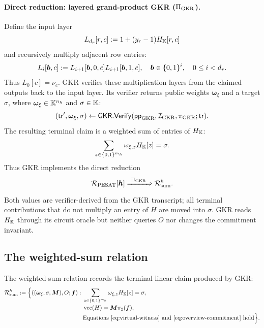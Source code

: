 \paragraph{Direct reduction: layered grand-product GKR
($\Pi_{\rm GKR}$).}
Define the input layer
\begin{equation}
 L_{d_r}[r,c]
 :=1+(y_r-1)H_{\mathbb K}[r,c]
 \label{eq:pesat-input-layer}
\end{equation}
and recursively multiply adjacent row entries:
\begin{equation}
 L_i[\bm b,c]
 :=L_{i+1}[\bm b,0,c]
   L_{i+1}[\bm b,1,c],
 \quad \bm b\in\{0,1\}^i,\quad 0\le i<d_r.
 \label{eq:pesat-product-layers}
\end{equation}
Thus $L_0[c]=\nu_c$.  GKR verifies these multiplication
layers from the claimed outputs back to the input layer.  Its verifier
returns public weights $\bm\omega_{\xi}$ and a target $\sigma$, where
$\bm\omega_{\xi}\in\mathbb K^{n_h}$ and $\sigma\in\mathbb K$:
\begin{equation}
 (\mathsf{tr}',\bm\omega_{\xi},\sigma)
 \leftarrow
 \mathsf{GKR.Verify}
 (\mathsf{pp}_{\rm GKR},\mathcal I_{\rm GKR},
  \pi_{\rm GKR};\mathsf{tr}).
 \label{eq:gkr-verifier-contract}
\end{equation}
The resulting terminal claim is a weighted sum of entries of $H_{\mathbb K}$:
\begin{equation}
 \sum_{z\in\{0,1\}^{m_h}}
   \omega_{\xi,z}H_{\mathbb K}[z]=\sigma.
 \label{eq:gkr-terminal-weighted-sum}
\end{equation}
Thus GKR implements the direct reduction
\begin{equation}
 \mathcal R_{\rm PESAT}[\bm h]
 \xRightarrow{\ \Pi_{\rm GKR}\ }
 \mathcal R_{\rm sum}^{h}.
 \label{eq:edge-pesat-sum}
\end{equation}
Both values are verifier-derived from the GKR transcript; all terminal
contributions that do not multiply an entry of $H$ are moved into $\sigma$.
GKR reads $H_{\mathbb K}$ through its circuit oracle but neither queries $O$ nor
changes the commitment invariant.

\subsection{The weighted-sum relation}

The weighted-sum relation records the terminal linear claim produced by GKR:
\begin{align}
 \mathcal R_{\rm sum}^{h}:=
 \Bigl\{((\bm\omega_{\xi},\sigma,\bm M),O;\bm f):\;&
  \sum_{z\in\{0,1\}^{m_h}}
    \omega_{\xi,z}H_{\mathbb K}[z]=\sigma,\notag\\[-2pt]
 &\operatorname{vec}(H)=\bm M\pi_2(\bm f),\notag\\[-2pt]
 &\text{Equations~\eqref{eq:virtual-witness} and
   \eqref{eq:overview-commitment} hold}
 \Bigr\}.
 \label{eq:rel-sum-h}
\end{align}

